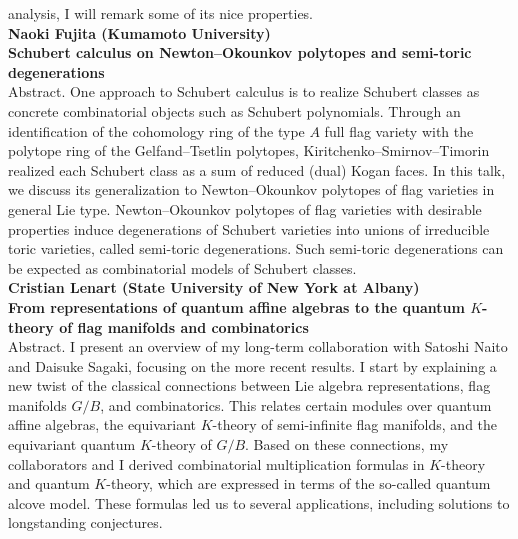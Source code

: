 \documentclass[12pt,landscape]{jarticle}
\begin{document}
analysis, I will remark some of its nice properties. 
\\[5mm]
{\bf\large Naoki Fujita (Kumamoto University)} \\
{\bf Schubert calculus on Newton--Okounkov polytopes and semi-toric degenerations} \\[1mm]
Abstract. 
One approach to Schubert calculus is to realize Schubert classes as concrete combinatorial objects such as Schubert polynomials. Through an identification of the cohomology ring of the type $A$ full flag variety with the polytope ring of the Gelfand--Tsetlin polytopes, Kiritchenko--Smirnov--Timorin realized each Schubert class as a sum of reduced (dual) Kogan faces. In this talk, we discuss its generalization to Newton--Okounkov polytopes of flag varieties in general Lie type. Newton--Okounkov polytopes of flag varieties with desirable properties induce degenerations of Schubert varieties into unions of irreducible toric varieties, called semi-toric degenerations. Such semi-toric degenerations can be expected as combinatorial models of Schubert classes.
\\[5mm]
{\bf\large Cristian Lenart (State University of New York at Albany)} \\
{\bf From representations of quantum affine algebras to the quantum $K$-theory of flag manifolds and combinatorics} \\[1mm]
Abstract. 
I present an overview of my long-term collaboration with Satoshi Naito and Daisuke Sagaki, focusing on the more recent results. I start by explaining a new twist of the classical connections between Lie algebra representations, flag manifolds $G/B$, and combinatorics. This relates certain modules over quantum affine algebras, the equivariant $K$-theory of semi-infinite flag manifolds, and the equivariant quantum $K$-theory of $G/B$. Based on these connections, my collaborators and I derived combinatorial multiplication formulas in $K$-theory and quantum $K$-theory, which are expressed in terms of the so-called quantum alcove model. These formulas led us to several applications, including solutions to longstanding conjectures. 
\\[5mm]
\end{document}
